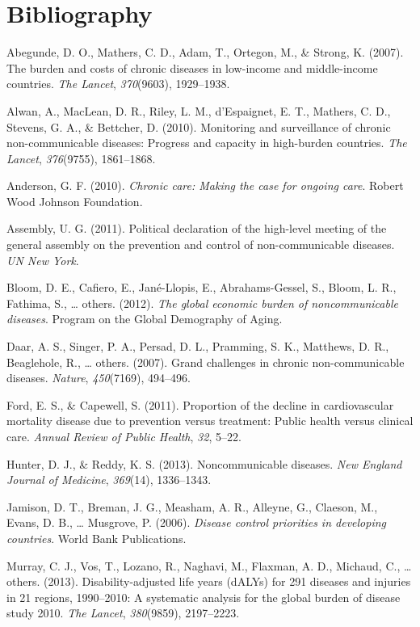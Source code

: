 \section*{Bibliography}\label{bibliography}

Abegunde, D. O., Mathers, C. D., Adam, T., Ortegon, M., \& Strong, K.
(2007). The burden and costs of chronic diseases in low-income and
middle-income countries. \emph{The Lancet}, \emph{370}(9603),
1929--1938.

Alwan, A., MacLean, D. R., Riley, L. M., d'Espaignet, E. T., Mathers, C.
D., Stevens, G. A., \& Bettcher, D. (2010). Monitoring and surveillance
of chronic non-communicable diseases: Progress and capacity in
high-burden countries. \emph{The Lancet}, \emph{376}(9755), 1861--1868.

Anderson, G. F. (2010). \emph{Chronic care: Making the case for ongoing
care}. Robert Wood Johnson Foundation.

Assembly, U. G. (2011). Political declaration of the high-level meeting
of the general assembly on the prevention and control of
non-communicable diseases. \emph{UN New York}.

Bloom, D. E., Cafiero, E., Jan{é}-Llopis, E., Abrahams-Gessel, S.,
Bloom, L. R., Fathima, S., \ldots{} others. (2012). \emph{The global
economic burden of noncommunicable diseases}. Program on the Global
Demography of Aging.

Daar, A. S., Singer, P. A., Persad, D. L., Pramming, S. K., Matthews, D.
R., Beaglehole, R., \ldots{} others. (2007). Grand challenges in chronic
non-communicable diseases. \emph{Nature}, \emph{450}(7169), 494--496.

Ford, E. S., \& Capewell, S. (2011). Proportion of the decline in
cardiovascular mortality disease due to prevention versus treatment:
Public health versus clinical care. \emph{Annual Review of Public
Health}, \emph{32}, 5--22.

Hunter, D. J., \& Reddy, K. S. (2013). Noncommunicable diseases.
\emph{New England Journal of Medicine}, \emph{369}(14), 1336--1343.

Jamison, D. T., Breman, J. G., Measham, A. R., Alleyne, G., Claeson, M.,
Evans, D. B., \ldots{} Musgrove, P. (2006). \emph{Disease control
priorities in developing countries}. World Bank Publications.

Murray, C. J., Vos, T., Lozano, R., Naghavi, M., Flaxman, A. D.,
Michaud, C., \ldots{} others. (2013). Disability-adjusted life years
(dALYs) for 291 diseases and injuries in 21 regions, 1990--2010: A
systematic analysis for the global burden of disease study 2010.
\emph{The Lancet}, \emph{380}(9859), 2197--2223.

